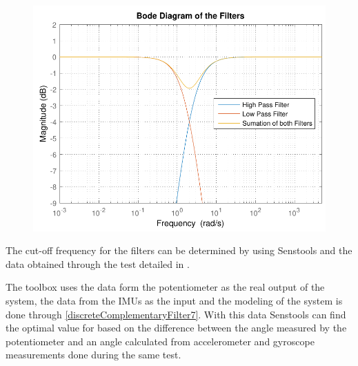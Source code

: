 \begin{minipage}{\linewidth}
\begin{minipage}{0.45\linewidth}
\begin{figure}[H]
			\includegraphics[scale=.55]{figures/bodeFilters2}
			\centering
			\captionsetup{justification=centering}
			\label{bodeFilters2}
		\end{figure}
	\end{minipage}
\end{minipage}

The cut-off frequency for the filters can be determined by using Senstools and the data obtained through the test detailed in .

The toolbox uses the data form the potentiometer as the real output of the system, the data from the IMUs as the input and the modeling of the system is done through \eqref{discreteComplementaryFilter7}. With this data Senstools can find the optimal value for \si{\tau} based on the difference between the angle measured by the potentiometer and an angle calculated from accelerometer and gyroscope measurements done during the same test.

